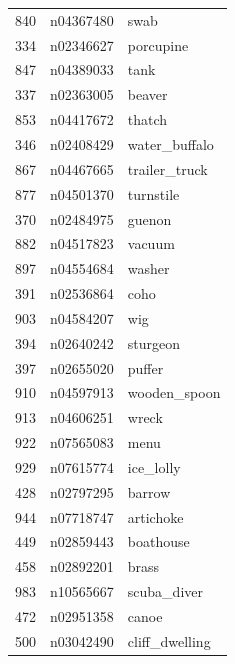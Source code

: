 \begin{table}
\begin{tabular}{cll}
840 & n04367480 & swab \\
334 & n02346627 & porcupine \\
847 & n04389033 & tank \\
337 & n02363005 & beaver \\
853 & n04417672 & thatch \\
346 & n02408429 & water_buffalo \\
867 & n04467665 & trailer_truck \\
877 & n04501370 & turnstile \\
370 & n02484975 & guenon \\
882 & n04517823 & vacuum \\
897 & n04554684 & washer \\
391 & n02536864 & coho \\
903 & n04584207 & wig \\
394 & n02640242 & sturgeon \\
397 & n02655020 & puffer \\
910 & n04597913 & wooden_spoon \\
913 & n04606251 & wreck \\
922 & n07565083 & menu \\
929 & n07615774 & ice_lolly \\
428 & n02797295 & barrow \\
944 & n07718747 & artichoke \\
449 & n02859443 & boathouse \\
458 & n02892201 & brass \\
983 & n10565667 & scuba_diver \\
472 & n02951358 & canoe \\
500 & n03042490 & cliff_dwelling \\
\bottomrule
\end{tabular}
\end{table}
